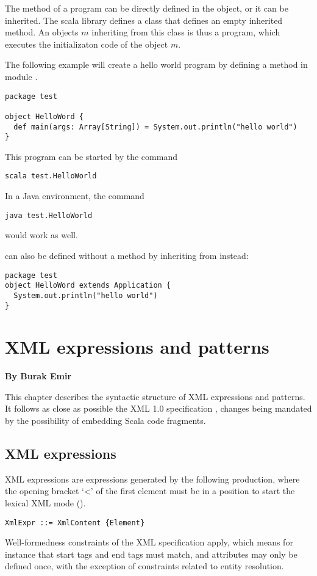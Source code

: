 The  method of a program can be directly defined in the
object, or it can be inherited. The scala library defines a class
 that defines an empty inherited  method.
An objects $m$ inheriting from this class is thus a program, 
which executes the initializaton code of the object $m$.

\example The following example will create a hello world program by defining
a method  in module .
\begin{lstlisting}
package test 

object HelloWord {
  def main(args: Array[String]) = System.out.println("hello world")
}
\end{lstlisting}

This program can be started by the command
\begin{lstlisting}
scala test.HelloWorld
\end{lstlisting}
In a Java environment, the command
\begin{lstlisting}
java test.HelloWorld
\end{lstlisting}
would work as well. 

 can also be defined without a  method 
by inheriting from  instead:
\begin{lstlisting}
package test 
object HelloWord extends Application {
  System.out.println("hello world")
}
\end{lstlisting}

\chapter{XML expressions and patterns}

{\bf By Burak Emir}\bigskip\bigskip


This chapter describes the syntactic structure of XML expressions and patterns.
It follows as close as possible the XML 1.0 specification \cite{w3c:xml},
changes being mandated by the possibility of embedding Scala code fragments.

\section{XML expressions}
XML expressions are expressions generated by the following production, where the 
opening bracket `<' of the first element must be in a position to start the lexical
XML mode ().

\syntax\begin{lstlisting}
XmlExpr ::= XmlContent {Element}
\end{lstlisting}
Well-formedness constraints of the XML specification apply, which
means for instance that start tags and end tags must match, and
attributes may only be defined once, with the exception of constraints
related to entity resolution.

